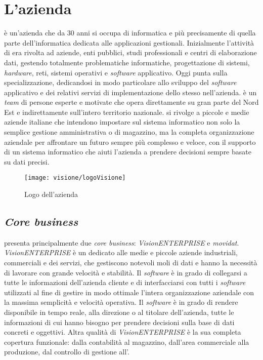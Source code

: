 \section{L'azienda}

\visione{} è un'azienda che da 30 anni si occupa di informatica e più precisamente di quella parte dell'informatica dedicata alle applicazioni gestionali. Inizialmente l'attività di \visione{} era rivolta ad aziende, enti pubblici, studi professionali e centri di elaborazione dati, gestendo totalmente problematiche informatiche, progettazione di sistemi, \textit{hardware}, reti, sistemi operativi e \textit{software} applicativo. Oggi \visione{} punta sulla specializzazione, dedicandosi in modo particolare allo sviluppo del \textit{software} applicativo e dei relativi servizi di implementazione dello stesso nell'azienda. \visione{} è un \textit{team} di persone esperte e motivate che opera direttamente su gran parte del Nord Est e indirettamente sull'intero territorio nazionale. \visione{} si rivolge a piccole e medie aziende italiane che intendono impostare sul sistema informatico non solo la semplice gestione amministrativa o di magazzino, ma la completa organizzazione aziendale per affrontare un futuro sempre più complesso e veloce, con il supporto di un sistema informatico che aiuti l'azienda a prendere decisioni sempre basate su dati precisi.

\begin{figure}[!h] 
    \centering 
    \texttt{[image: visione/logoVisione]} 
    \caption{Logo dell'azienda \visione{}}
\end{figure}

\subsection{\textit{Core business}}

\visione{} presenta principalmente due \textit{core business}: \textit{VisionENTERPRISE} e \textit{movidat}. \textit{VisionENTERPRISE} è un   dedicato alle medie e piccole aziende industriali, commerciali e dei servizi, che gestiscono notevoli moli di dati e hanno la necessità di lavorare con grande velocità e stabilità. Il \textit{software} è in grado di collegarsi a tutte le informazioni dell'azienda cliente e di interfacciarsi con tutti i \textit{software} utilizzati al fine di gestire in modo ottimale l'intera organizzazione aziendale con la massima semplicità e velocità operativa. Il \textit{software} è in grado di rendere disponibile in tempo reale, alla direzione o al titolare dell'azienda, tutte le informazioni di cui hanno bisogno per prendere decisioni sulla base di dati concreti e oggettivi. Altra qualità di \textit{VisionENTERPRISE} è la sua completa copertura funzionale: dalla contabilità al magazzino, dall'area commerciale alla produzione, dal controllo di gestione all'.

